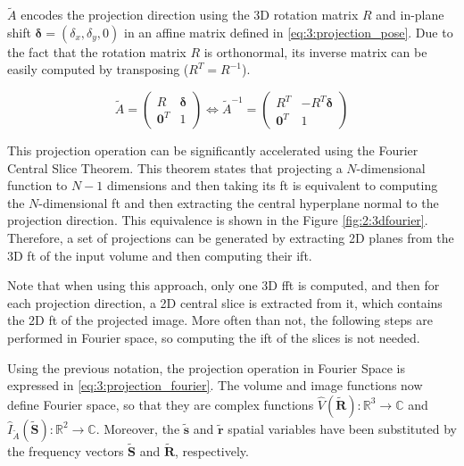 \documentclass[../main.tex]{subfiles}
\begin{document}
$\tilde{A}$ encodes the projection direction using the 3D rotation matrix $R$ and in-plane shift $\bm{\delta} = (\delta_x, \delta_y, 0)$ in an affine matrix defined in \eqref{eq:3:projection_pose}. Due to the fact that the rotation matrix $R$ is orthonormal, its inverse matrix can be easily computed by transposing ($R^T = R^{-1}$).

\begin{equation}\label{eq:3:projection_pose}
    \tilde{A} = 
    \begin{pmatrix}
        R & \bm{\delta} \\
        \bm{0}^T & 1
    \end{pmatrix}
    \Leftrightarrow
    \tilde{A}^{-1} = 
    \begin{pmatrix}
        R^T & -R^T\bm{\delta} \\
        \bm{0}^T & 1
    \end{pmatrix}
\end{equation}

This projection operation can be significantly accelerated using the Fourier Central Slice Theorem. This theorem states that projecting a $N$-dimensional function to $N-1$ dimensions and then taking its \gls{ft} is equivalent to computing the $N$-dimensional \gls{ft} and then extracting the central hyperplane normal to the projection direction\cite{kak2001}. This equivalence is shown in the Figure \ref{fig:2:3dfourier}. Therefore, a set of projections can be generated by extracting 2D planes from the 3D \gls{ft} of the input volume and then computing their \gls{ift}.

Note that when using this approach, only one 3D \gls{fft} is computed, and then for each projection direction, a 2D central slice is extracted from it, which contains the 2D \gls{ft} of the projected image. More often than not, the following steps are performed in Fourier space, so computing the \gls{ift} of the slices is not needed.

Using the previous notation, the projection operation in Fourier Space is expressed in \eqref{eq:3:projection_fourier}. The volume and image functions now define Fourier space, so that they are complex functions $\hat{V}(\bm{\tilde{R}}): \mathbb{R}^3 \rightarrow \mathbb{C}$ and $\hat{I}_{\tilde{A}}(\bm{\tilde{S}}): \mathbb{R}^2 \rightarrow \mathbb{C}$. Moreover, the $\bm{\tilde{s}}$ and $\bm{\tilde{r}}$ spatial variables have been substituted by the frequency vectors $\bm{\tilde{S}}$ and $\bm{\tilde{R}}$, respectively\cite{sorzano2017b}.
\end{document}
